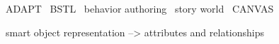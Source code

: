 ADAPT~\cite{Shoulson:2013:EPA:2522628.2522629}
BSTL~\cite{2015-fdg-bstl,Kapadia:2015:CAI:2699276.2699279}
behavior authoring~\cite{behaviorCGA,Kapadia:2011:BAC:1944745.1944779}
story world~\cite{AIIDE1511583}
CANVAS~\cite{Kapadia:2016:CCN:2982818.2982846}


smart object representation --> attributes and relationships 

